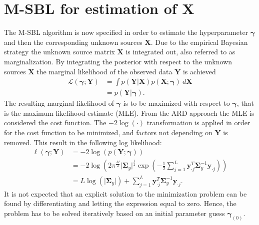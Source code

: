 \section{M-SBL for estimation of $\mathbf{X}$}\label{seg:M_sblalg}
The M-SBL algorithm is now specified in order to estimate the hyperparameter $\boldsymbol{\gamma}$ and then the corresponding unknown sources $\mathbf{X}$.
Due to the empirical Bayesian strategy the unknown source matrix $\mathbf{X}$ is integrated out, also referred to as marginalization.
By integrating the posterior with respect to the unknown sources $\mathbf{X}$ the marginal likelihood of the observed data $\mathbf{Y}$ is achieved \cite[p. 146]{phd_wipf} 
\begin{align*}
\mathcal{L}(\boldsymbol{\gamma};\textbf{Y}) &= \int p (\mathbf{Y} \vert \mathbf{X}) p (\mathbf{X} ; \boldsymbol{\gamma}) \ d\mathbf{X} \\
&= p (\mathbf{Y} \vert \boldsymbol{\gamma}).
\end{align*}
The resulting marginal likelihood of $\boldsymbol{\gamma}$ is to be maximized with respect to $\boldsymbol{\gamma}$, that is the maximum likelihood estimate (MLE). 
From the ARD approach the MLE is considered the cost function. 
The $-2 \log (\cdot)$ transformation is applied in order for the cost function to be minimized, and factors not depending on $\mathbf{Y}$ is removed. This result in the following log likelihood: 
\begin{align}
\ell(\boldsymbol{\gamma};\textbf{Y})&= - 2 \log(p (\mathbf{Y} ; \boldsymbol{\gamma}))\nonumber \\ 
&= -2\log \left( 2\pi^{\frac{M}{2}}\vert \boldsymbol{\Sigma}_{y}\vert^{\frac{1}{2}}\exp \left( - \frac{1}{2} \sum_{j=1}^L \textbf{y}_{\cdot j}^T \boldsymbol{\Sigma}_{y}^{-1} \textbf{y}_{\cdot j} \right) \right)\nonumber \\
&= L \log ( \vert \boldsymbol{\Sigma}_y \vert ) + \sum_{j=1}^L \mathbf{y}_{\cdot j}^T \boldsymbol{\Sigma}_y ^{-1} \mathbf{y}_{\cdot j}.\label{eq:likelihood}
\end{align}
It is not expected that an explicit solution to the minimization problem can be found by differentiating and letting the expression equal to zero. 
Hence, the problem has to be solved iteratively based on an initial parameter guess $\boldsymbol{\gamma}_{(0)}$.

